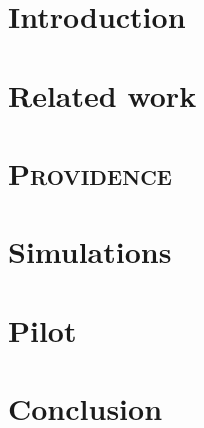 \documentclass[runningheads]{llncs}
\newcommand{\Providence}{\textsc{Providence}\xspace}
\begin{document}
\section{Introduction}
\label{sec:intro}


\section{Related work}
\label{sec:related}


\section{\Providence}
\label{sec:prov}


\section{Simulations}
\label{sec:sims}


\section{Pilot}
\label{sec:pilot}


\section{Conclusion}
\label{sec:conc}




%
%
%


%
\end{document}
